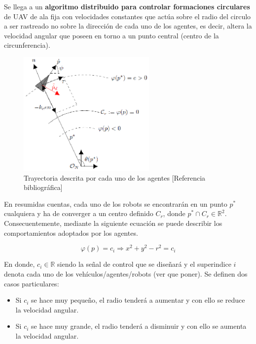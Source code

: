 Se llega a un \textbf{algoritmo distribuido para controlar formaciones circulares} de UAV de ala fija con velocidades constantes que actúa sobre el radio del circulo a ser rastreado no sobre la dirección de cada uno de los agentes, es decir, altera la velocidad angular que poseen en torno a un punto central (centro de la circunferencia).\\

\begin{figure}[htb]
\centering
\includegraphics[width=0.6\textwidth]{figures/TA.eps}
\caption{Trayectoria descrita por cada uno de los agentes [Referencia bibliográfica]} \label{fig:Trayectory}
\end{figure}

En resumidas cuentas, cada uno de los robots se encontrarán en un punto $p^*$ cualquiera y ha de converger a un centro definido $C_r$, donde $p^* \cap {C}_r \in \mathbb{R}^{2}$. Consecuentemente, mediante la siguiente ecuación se puede describir los comportamientos adoptados por los agentes.

\begin{equation}\label{Control}
	\varphi\left(p\right)=c_i \Longrightarrow x^2+y^2 - r^2 = c_i
\end{equation}

En donde, $c_i \in \mathbb{R}$ siendo la señal de control que se diseñará y el superindice $i$ denota cada uno de los vehículos/agentes/robots (ver que poner). Se definen dos casos particulares:

\begin{itemize}
	\item Si $c_i$ se hace muy pequeño, el radio tenderá a aumentar y con ello se reduce la velocidad angular.
	\item Si $c_i$ se hace muy grande, el radio tenderá a disminuir y con ello se aumenta la velocidad angular.
\end{itemize}


